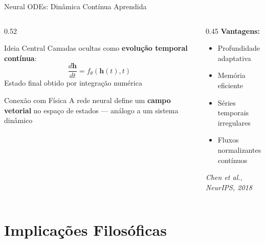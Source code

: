 \documentclass[aspectratio=169,12pt]{beamer}
\begin{document}
\begin{frame}{Neural ODEs: Dinâmica Contínua Aprendida}
    \begin{columns}[T]
        \begin{column}{0.52\textwidth}
            \begin{block}{Ideia Central}
                Camadas ocultas como \textbf{evolução temporal contínua}:
                \begin{equation*}
                    \frac{d\mathbf{h}}{dt} = f_\theta(\mathbf{h}(t), t)
                \end{equation*}
                Estado final obtido por integração numérica
            \end{block}

            \begin{alertblock}{Conexão com Física}
                A rede neural define um \textbf{campo vetorial} no espaço de estados --- análogo a um sistema dinâmico
            \end{alertblock}
        \end{column}
        \begin{column}{0.45\textwidth}
            \textbf{Vantagens:}
            \begin{itemize}
                \item Profundidade adaptativa
                \item Memória eficiente
                \item Séries temporais irregulares
                \item Fluxos normalizantes contínuos
            \end{itemize}

            \vspace{0.3cm}
            \small\textit{Chen et al., NeurIPS, 2018}
        \end{column}
    \end{columns}
\end{frame}

\section{Implicações Filosóficas}
\end{document}
